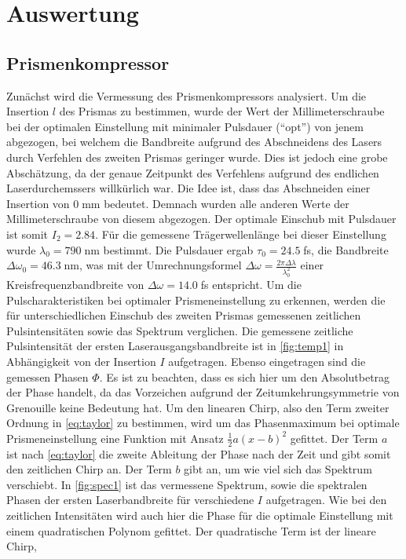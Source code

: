 \documentclass[twoside,        %
               BCOR12mm,       %
               english,ngerman, %
               fleqn,headsepline=false,footsepline=false
              ]{Vorlage/MFPREPORT}
\begin{document}
\section{Auswertung}
\label{sec:auswertung}
\subsection{Prismenkompressor}
Zunächst wird die Vermessung des Prismenkompressors analysiert. Um die Insertion $l$ des
Prismas zu bestimmen, wurde der Wert der Millimeterschraube bei der optimalen
Einstellung mit minimaler Pulsdauer (``opt'') von jenem abgezogen, bei welchem
die Bandbreite aufgrund des Abschneidens des Lasers durch Verfehlen des zweiten
Prismas geringer wurde. Dies ist jedoch eine grobe Abschätzung, da der genaue
Zeitpunkt des Verfehlens aufgrund des endlichen Laserdurchemssers willkürlich
war. Die Idee ist, dass das Abschneiden einer Insertion von $0\;$mm bedeutet.
Demnach wurden alle anderen Werte der Millimeterschraube von diesem abgezogen. 
Der optimale Einschub mit Pulsdauer ist somit $I_2=2.84$. Für die gemessene
Trägerwellenlänge bei dieser Einstellung wurde $\lambda_0=790\;$nm bestimmt. Die
Pulsdauer ergab $\tau_0=24.5\;$fs, die Bandbreite $\Delta\omega_0=46.3\;$nm,
was mit der Umrechnungsformel $\Delta\omega=\frac{2\pi\Delta\lambda}{\lambda_0^2}$ einer Kreisfrequenzbandbreite von $\Delta\omega=14.0\;$fs entspricht.
Um die Pulscharakteristiken bei optimaler Prismeneinstellung zu erkennen,
werden die für unterschiedlichen Einschub des zweiten Prismas gemessenen zeitlichen
Pulsintensitäten sowie das Spektrum verglichen. 
Die gemessene zeitliche Pulsintensität der ersten Laserausgangsbandbreite ist in
\cref{fig:temp1} in Abhängigkeit von der Insertion $I$ aufgetragen. Ebenso
eingetragen sind die gemessen Phasen $\Phi$. Es ist zu beachten, dass es sich
hier um den Absolutbetrag der Phase handelt, da das Vorzeichen aufgrund der
Zeitumkehrungsymmetrie von Grenouille keine Bedeutung hat. Um den linearen Chirp, also den Term zweiter Ordnung in \cref{eq:taylor} zu bestimmen, wird um das
Phasenmaximum bei optimale Prismeneinstellung eine Funktion mit Ansatz
$\frac{1}{2}a(x-b)^2$ gefittet. Der Term $a$ ist nach \cref{eq:taylor} die
zweite Ableitung der Phase nach der Zeit und gibt somit den zeitlichen Chirp
an. Der Term $b$ gibt an, um wie viel sich das Spektrum verschiebt. In \cref{fig:spec1} ist das vermessene Spektrum, sowie die spektralen Phasen der ersten Laserbandbreite für verschiedene $I$ aufgetragen. Wie bei den zeitlichen Intensitäten wird auch hier die Phase für die optimale Einstellung mit einem quadratischen Polynom gefittet. Der quadratische Term ist der lineare Chirp,
\end{document}
